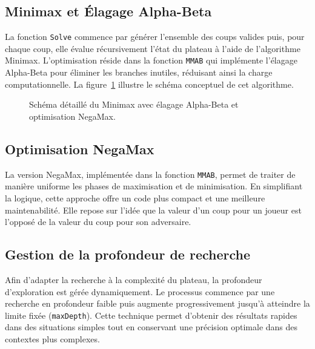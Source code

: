 \documentclass[a4paper,12pt]{article}
\begin{document}
\subsection{Minimax et Élagage Alpha-Beta}
La fonction \texttt{Solve} commence par générer l'ensemble des coups valides puis, pour chaque coup, elle évalue récursivement l'état du plateau à l'aide de l'algorithme Minimax. L'optimisation réside dans la fonction \texttt{MMAB} qui implémente l'élagage Alpha-Beta pour éliminer les branches inutiles, réduisant ainsi la charge computationnelle. La figure~\ref{fig:minimax} illustre le schéma conceptuel de cet algorithme.

\begin{figure}[H]
\centering
{}
\caption{Schéma détaillé du Minimax avec élagage Alpha-Beta et optimisation NegaMax.}
\label{fig:minimax}
\end{figure}

\subsection{Optimisation NegaMax}
La version NegaMax, implémentée dans la fonction \texttt{MMAB}, permet de traiter de manière uniforme les phases de maximisation et de minimisation. En simplifiant la logique, cette approche offre un code plus compact et une meilleure maintenabilité. Elle repose sur l'idée que la valeur d'un coup pour un joueur est l'opposé de la valeur du coup pour son adversaire.

\subsection{Gestion de la profondeur de recherche}
Afin d'adapter la recherche à la complexité du plateau, la profondeur d'exploration est gérée dynamiquement. Le processus commence par une recherche en profondeur faible puis augmente progressivement jusqu'à atteindre la limite fixée (\texttt{maxDepth}). Cette technique permet d'obtenir des résultats rapides dans des situations simples tout en conservant une précision optimale dans des contextes plus complexes.
\end{document}
